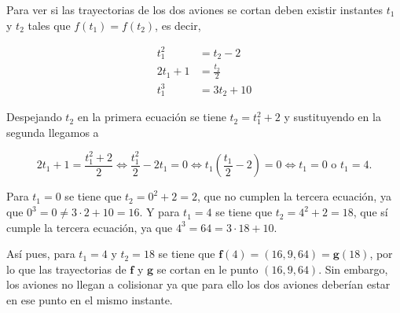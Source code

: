 \documentclass[
  a4paper,
]{scrreport}
\theoremstyle{definition}
\theoremstyle{remark}
\begin{document}
\begin{tcolorbox}[enhanced jigsaw, left=2mm, coltitle=black, colbacktitle=quarto-callout-tip-color!10!white, opacitybacktitle=0.6, colback=white, breakable, titlerule=0mm, toptitle=1mm, rightrule=.15mm, bottomtitle=1mm, bottomrule=.15mm, toprule=.15mm, leftrule=.75mm, arc=.35mm, opacityback=0, title=\textcolor{quarto-callout-tip-color}{\faLightbulb}\hspace{0.5em}{Solución}, colframe=quarto-callout-tip-color-frame]

Para ver si las trayectorias de los dos aviones se cortan deben existir
instantes \(t_1\) y \(t_2\) tales que \(f(t_1)=f(t_2)\), es decir,

\begin{align*}
t_1^2 &= t_2-2\\
2t_1+1 &= \frac{t_2}{2}\\
t_1^3 &= 3t_2+10
\end{align*}

Despejando \(t_2\) en la primera ecuación se tiene \(t_2 = t_1^2+2\) y
sustituyendo en la segunda llegamos a

\[
2t_1 + 1 = \frac{t_1^2+2}{2} \Leftrightarrow \frac{t_1^2}{2}-2t_1 = 0 \Leftrightarrow t_1\left(\frac{t_1}{2}-2\right)=0 \Leftrightarrow t_1 = 0 \mbox{ o } t_1 = 4.
\]

Para \(t_1=0\) se tiene que \(t_2 = 0^2+2 = 2\), que no cumplen la
tercera ecuación, ya que \(0^3=0\neq 3\cdot 2 +10 =16\). Y para
\(t_1=4\) se tiene que \(t_2=4^2+2=18\), que sí cumple la tercera
ecuación, ya que \(4^3 = 64 = 3\cdot 18 + 10\).

Así pues, para \(t_1=4\) y \(t_2=18\) se tiene que
\(\mathbf{f}(4) = (16, 9, 64) = \mathbf{g}(18)\), por lo que las
trayectorias de \(\mathbf{f}\) y \(\mathbf{g}\) se cortan en le punto
\((16, 9, 64)\). Sin embargo, los aviones no llegan a colisionar ya que
para ello los dos aviones deberían estar en ese punto en el mismo
instante.

\end{tcolorbox}
\end{document}
